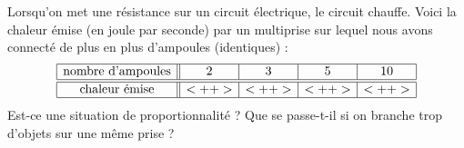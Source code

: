 
\begin{exercice}\label{exo2smath-0118}

    Lorsqu'on met une résistance sur un circuit électrique, le circuit chauffe. Voici la chaleur émise (en joule par seconde) par un multiprise sur lequel nous avons connecté de plus en plus d'ampoules (identiques) :
    \begin{equation*}
        \begin{array}[]{|c||c|c|c|c|}
            \hline
            \text{nombre d'ampoules}&2&3&5&10\\
            \hline\hline
            \text{chaleur émise}&<++>&<++>&<++>&<++>\\
            \hline
        \end{array}
    \end{equation*}
    Est-ce une situation de proportionnalité ? Que se passe-t-il si on branche trop d'objets sur une même prise ?

\end{exercice}

